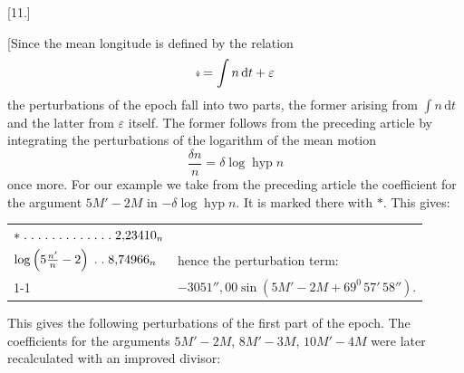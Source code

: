 \clearpage
\begin{landscape}
\begingroup
\fontsize{10}{13}\selectfont
{}
\renewcommand{\headrulewidth}{0pt}
\begin{center}[11.]\end{center}
\begingroup
\newcommand{\VElevenLongitude}{\mathord{\tikz[x=1ex,y=1ex,baseline=0.08ex,line width=.075ex,line cap=round,line join=round]{\draw (.30,1.05) .. controls (.24,.92) and (.02,.76) .. (.04,.62) .. controls (.07,.43) and (.52,.43) .. (.56,.62) .. controls (.58,.76) and (.37,.94) .. (.30,1.05);\draw (.30,.10)--(.30,.67);\draw (.04,.30)--(.56,.30);}}}
\par\noindent\hspace*{\parindent}[Since the mean longitude is defined by the relation
\[
\VElevenLongitude=\int n\,\mathrm{d}t+\varepsilon
\]
the perturbations of the epoch fall into two parts, the former arising from \(\int n\,\mathrm{d}t\) and the latter from \(\varepsilon\) itself. The former follows from the preceding article by integrating the perturbations of the logarithm of the mean motion
\[
\frac{\delta n}{n}=\delta\log\operatorname{hyp}n
\]
once more. For our example we take from the preceding article the coefficient for the argument \(5M'-2M\) in \(-\delta\log\operatorname{hyp}n\). It is marked there with \(*\). This gives:
\endgroup
\begingroup
\newcommand{\VElevenPoint}{\mathord{.}\mkern5mu}
\newcommand{\VElevenFive}{\VElevenPoint\VElevenPoint\VElevenPoint\VElevenPoint\VElevenPoint}
\begin{center}
\begin{tabular}{@{}l@{\quad}l@{}}
\(*\;\VElevenFive\VElevenFive\VElevenPoint\VElevenPoint\VElevenPoint2{,}23410_n\)&\\
\(\log\left(5\frac{n'}{n}-2\right)\;\VElevenPoint\VElevenPoint8{,}74966_n\)&hence the perturbation term:\\
\cline{1-1}
\multicolumn{1}{r}{\(3{,}48444\)}&\(-3051''{,}00\sin(5M'-2M+69^0\,57'\,58'').\)
\end{tabular}
\end{center}
\endgroup
\par\noindent\hspace*{\parindent}This gives the following perturbations of the first part of the epoch. The coefficients for the arguments \(5M'-2M\), \(8M'-3M\), \(10M'-4M\) were later recalculated with an improved divisor:
\begingroup
\renewcommand{\arraystretch}{1.15}

\end{landscape}
